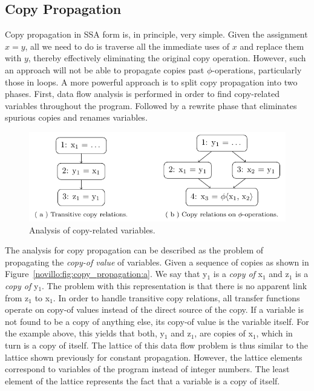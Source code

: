 \subsection{Copy Propagation}
\label{novillo:sec:copy-prop}

Copy propagation in SSA form is, in principle, very simple.  Given the
assignment \linebreak $x = y$, all we need to do is traverse all the immediate
uses of $x$ and replace them with $y$, thereby effectively eliminating the
original copy operation. However, such an approach will not be able to propagate
copies past $\phi$-operations, particularly those in loops. A more powerful
approach is to split copy propagation into two phases. First, data flow analysis
is performed in order to find copy-related variables throughout the program.
Followed by a rewrite phase that eliminates spurious copies and renames
variables.

\begin{figure}[b!]
  \begin{center}
    \includegraphics{copy_propagation}
    \subfigure{\label{novillo:fig:copy_propagation:a}}
    \subfigure{\label{novillo:fig:copy_propagation:b}}
  \end{center}
  \vspace{-1em}
  \caption{Analysis of copy-related variables.}
  \label{novillo:fig:copy_propagation}
\end{figure}

The analysis for copy propagation can be described as the problem of
propagating the \textit{copy-of value} of variables.  Given a sequence of
copies as shown in Figure~\ref{novillo:fig:copy_propagation:a}. We say that
y$_1$ is a \textit{copy of} x$_1$ and z$_1$ is a \textit{copy of} y$_1$.  The
problem with this representation is that there is no apparent link from z$_1$ to
x$_1$.  In order to handle transitive copy relations, all transfer functions
operate on copy-of values instead of the direct source of the copy.  If a
variable is not found to be a copy of anything else, its copy-of value is the
variable itself. For the example above, this yields that both, y$_1$ and z$_1$,
are copies of x$_1$, which in turn is a copy of itself. The lattice of this data
flow problem is thus similar to the lattice shown previously for constant
propagation. However, the lattice elements correspond to variables of the
program instead of integer numbers. The least element of the lattice
represents the fact that a variable is a copy of itself.

